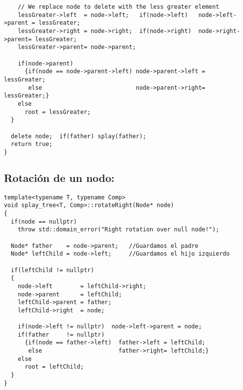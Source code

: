 \documentclass[letterpaper,12pt]{article}
\begin{document}
\begin{lstlisting}
    // We replace node to delete with the less greater element
    lessGreater->left  = node->left;   if(node->left)   node->left->parent = lessGreater;
    lessGreater->right = node->right;  if(node->right)  node->right->parent= lessGreater;
    lessGreater->parent= node->parent;

    if(node->parent)
      {if(node == node->parent->left) node->parent->left = lessGreater;
       else                           node->parent->right= lessGreater;}
    else
      root = lessGreater;
  }

  delete node;  if(father) splay(father);
  return true;
}
\end{lstlisting}

\subsection{Rotación de un nodo:}
\begin{lstlisting}
template<typename T, typename Comp>
void splay_tree<T, Comp>::rotateRight(Node* node)
{
  if(node == nullptr)
    throw std::domain_error("Right rotation over null node!");

  Node* father    = node->parent;   //Guardamos el padre
  Node* leftChild = node->left;     //Guardamos el hijo izquierdo

  if(leftChild != nullptr)
  {
    node->left        = leftChild->right;
    node->parent      = leftChild;
    leftChild->parent = father;
    leftChild->right  = node;

    if(node->left != nullptr)  node->left->parent = node;
    if(father     != nullptr)
      {if(node == father->left)  father->left = leftChild;
       else                      father->right= leftChild;}
    else
      root = leftChild;
  }
}
\end{lstlisting}
\end{document}
